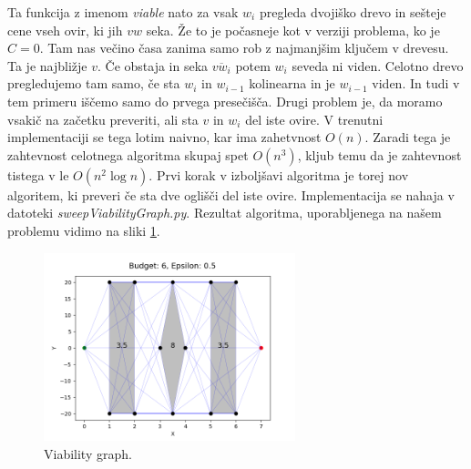 \documentclass{article}
\begin{document}
Ta funkcija z imenom \emph{viable} nato za vsak $w_i$ pregleda dvojiško drevo in sešteje cene vseh ovir, ki jih $vw$ seka. Že to je počasneje kot v verziji problema, ko je $C = 0$. Tam nas večino časa zanima samo rob z najmanjšim ključem v drevesu. Ta je najbližje $v$. Če obstaja in seka $\overline{vw_i}$ potem $w_i$ seveda ni viden. Celotno drevo pregledujemo tam samo, če sta $w_i$ in $w_{i-1}$ kolinearna in je $w_{i-1}$ viden. In tudi v tem primeru iščemo samo do prvega presečišča. Drugi problem je, da moramo vsakič na začetku preveriti, ali sta $v$ in $w_i$ del iste ovire. V trenutni implementaciji se tega lotim naivno, kar ima zahetvnost $O(n)$. Zaradi tega je zahtevnost celotnega algoritma skupaj spet $O(n^3)$, kljub temu da je zahtevnost tistega v \cite{BCKO} le $O(n^2 \log n)$. Prvi korak v izboljšavi algoritma je torej nov algoritem, ki preveri če sta dve oglišči del iste ovire. Implementacija se nahaja v datoteki \emph{sweepViabilityGraph.py}. Rezultat algoritma, uporabljenega na našem problemu vidimo na sliki \ref{fig:errG1}.

\begin{figure}[h]
    \centering
    \includegraphics[width=0.65\textwidth]{errGraph1.png}
    \caption{Viability graph.}
    \label{fig:errG1}
\end{figure}

 
\end{document}
